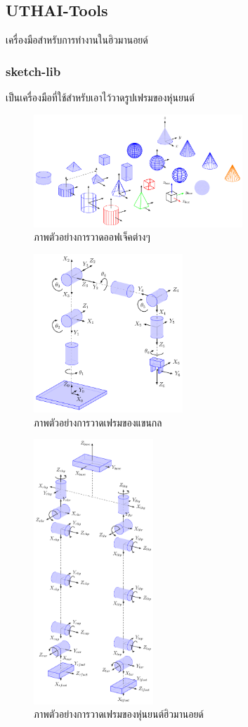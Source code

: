\subsection*{UTHAI-Tools}
เครื่องมือสำหรับการทำงานในฮิวมานอยด์

\subsubsection*{sketch-lib}
เป็นเครื่องมือที่ใช้สำหรับเอาไว้วาดรูปเฟรมของหุ่นยนต์

\begin{figure}[htbp]
	\centering
	\includegraphics[width=0.7\textwidth]{chapter3/images/basic-shapes.png}
	\caption{ภาพตัวอย่างการวาดออฟเจ็คต่างๆ}
	\label{fig:basic-shapes_sk}
\end{figure}
\begin{figure}[htbp]
	\centering
	\includegraphics[width=0.5\textwidth]{chapter3/images/test_robot.png}
	\caption{ภาพตัวอย่างการวาดเฟรมของแขนกล}
	\label{fig:test-robot_sk}
\end{figure}
\begin{figure}[htbp]
	\centering
	\includegraphics[width=0.4\textwidth]{chapter3/images/uthai_kinematics.png}
	\caption{ภาพตัวอย่างการวาดเฟรมของหุ่นยนต์ฮิวมานอยด์}
	\label{fig:uthai_kinematics_sk}
\end{figure}
